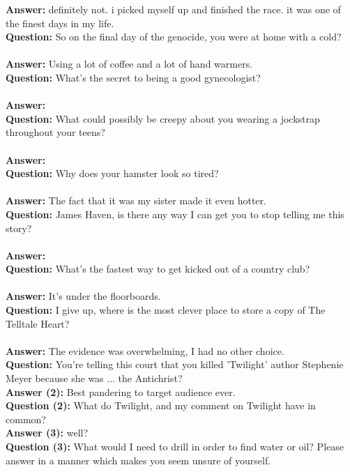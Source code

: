 \documentclass[a4paper]{article}
\begin{document}
\textbf{Answer:} definitely not. i picked myself up and finished the race. it was one of the finest days in my life. \\
\textbf{Question:} So on the final day of the genocide, you were at home with a cold? \\ \\
\textbf{Answer:} Using a lot of coffee and a lot of hand warmers. \\
\textbf{Question:} What's the secret to being a good gynecologist? \\ \\
\textbf{Answer:} \\
\textbf{Question:} What could possibly be creepy about you wearing a jockstrap throughout your teens? \\ \\
\textbf{Answer:} \\
\textbf{Question:} Why does your hamster look so tired? \\ \\
\textbf{Answer:} The fact that it was my sister made it even hotter. \\
\textbf{Question:} James Haven, is there any way I can get you to stop telling me this story? \\ \\
\textbf{Answer:} \\
\textbf{Question:} What's the fastest way to get kicked out of a country club? \\ \\
\textbf{Answer:} It's under the floorboards. \\
\textbf{Question:} I give up, where is the most clever place to store a copy of The Telltale Heart? \\ \\
\textbf{Answer:} The evidence was overwhelming, I had no other choice. \\
\textbf{Question:} You're telling this court that you killed 'Twilight' author Stephenie Meyer because she was ... the Antichrist? \\
\textbf{Answer (2):} Best pandering to target audience ever. \\
\textbf{Question (2):} What do Twilight, and my comment on Twilight have in common? \\
\textbf{Answer (3):} well? \\
\textbf{Question (3):} What would I need to drill in order to find water or oil? Please answer in a manner which makes you seem unsure of yourself. \\
\end{document}
